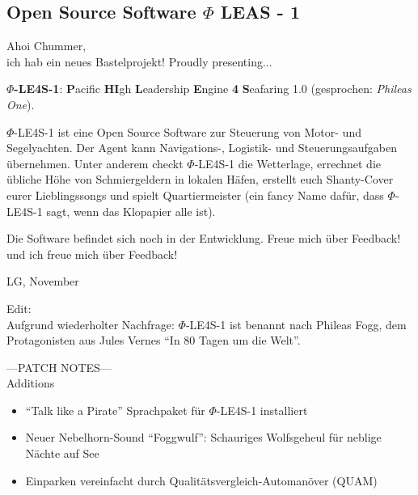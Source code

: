 \documentclass[final]{multiversum}
\begin{document}
\makemultititle
%

\subsection{Open Source Software $\Phi$ LEAS - 1}
Ahoi Chummer,\\
ich hab ein neues Bastelprojekt! Proudly presenting...

\textbf{$\Phi$-LE4S-1}: \textbf{P}acific \textbf{HI}gh \textbf{L}eadership
\textbf{E}ngine \textbf{4} \textbf{S}eafaring 1.0 (gesprochen: \textit{Phileas
One}).

$\Phi$-LE4S-1 ist eine Open Source Software zur Steuerung von Motor- und
Segelyachten. Der Agent kann Navigations-, Logistik- und Steuerungsaufgaben
übernehmen. Unter anderem checkt $\Phi$-LE4S-1 die Wetterlage, errechnet die
übliche Höhe von Schmiergeldern in lokalen Häfen,  erstellt euch Shanty-Cover
eurer Lieblingssongs und spielt Quartiermeister (ein fancy Name dafür, dass
$\Phi$-LE4S-1 sagt, wenn das Klopapier alle ist).

Die Software befindet sich noch in der Entwicklung. Freue mich über Feedback!
und ich freue mich über Feedback!

LG, November

\bigskip

Edit:\\
Aufgrund wiederholter Nachfrage: $\Phi$-LE4S-1 ist benannt nach Phileas Fogg,
dem Protagonisten aus Jules Vernes \enquote{In 80 Tagen um die Welt}.


\bigskip

---PATCH NOTES---\\
Additions
\begin{itemize}
    \item \enquote{Talk like a Pirate} Sprachpaket für $\Phi$-LE4S-1 installiert
    \item Neuer Nebelhorn-Sound \enquote{Foggwulf}: Schauriges Wolfsgeheul für neblige
    Nächte auf See
    \item Einparken vereinfacht durch Qualitätsvergleich-Automanöver (QUAM)
\end{itemize}

\bigskip
\end{document}

